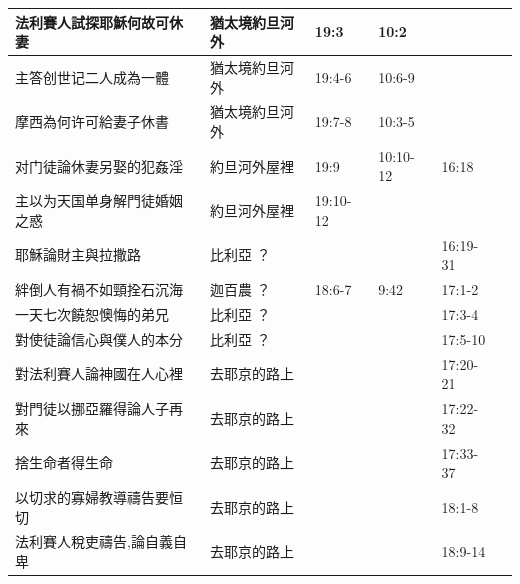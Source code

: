 \begin{table}[H]
\begin{tabular}{p{14em}|p{7.93em}|l|l|l|p{4.855em}}
法利賽人試探耶穌何故可休妻&猶太境約旦河外 &19:3&10:2& \multicolumn{1}{p{5.285em}|}{} & \multicolumn{1}{l}{} \\\midrule
主答创世记二人成為一體&猶太境約旦河外 &19:4-6&10:6-9& \multicolumn{1}{p{5.285em}|}{} & \multicolumn{1}{l}{} \\\midrule
摩西為何许可給妻子休書&猶太境約旦河外 &19:7-8&10:3-5& \multicolumn{1}{p{5.285em}|}{} & \multicolumn{1}{l}{} \\\midrule

对门徒論休妻另娶的犯姦淫&約旦河外屋裡 & 19:9 &10:10-12& \multicolumn{1}{p{5.285em}|}{16:18} & \multicolumn{1}{l}{} \\\midrule
主以为天国单身解門徒婚姻之惑&約旦河外屋裡  & \multicolumn{1}{p{5.285em}|}{19:10-12} & \multicolumn{1}{p{5.57em}|}{} &       & \multicolumn{1}{l}{} \\\midrule

耶穌論財主與拉撒路 & 比利亞 ？  &       &       & \multicolumn{1}{p{5.285em}|}{16:19-31} & \multicolumn{1}{l}{} \\ \midrule

絆倒人有禍不如頸拴石沉海& 迦百農 ？  &  \multicolumn{1}{p{5.285em}|}{18:6-7} & \multicolumn{1}{p{5.57em}|}{9:42}  & \multicolumn{1}{p{5.285em}|}{17:1-2} & \multicolumn{1}{l}{} \\\midrule

一天七次饒恕懊悔的弟兄& 比利亞 ？  &       &       & \multicolumn{1}{p{5.285em}|}{17:3-4} & \multicolumn{1}{l}{} \\\midrule

對使徒論信心與僕人的本分 & 比利亞 ？  &       &       & \multicolumn{1}{p{5.285em}|}{17:5-10} & \multicolumn{1}{l}{} \\\midrule


對法利賽人論神國在人心裡&去耶京的路上&       &       & \multicolumn{1}{p{5.285em}|}{17:20-21} & \multicolumn{1}{l}{} \\ \midrule

對門徒以挪亞羅得論人子再來&去耶京的路上&       &       & \multicolumn{1}{p{5.285em}|}{17:22-32} & \multicolumn{1}{l}{} \\ \midrule

捨生命者得生命&去耶京的路上&       &       & \multicolumn{1}{p{5.285em}|}{17:33-37} & \multicolumn{1}{l}{} \\ \midrule


以切求的寡婦教導禱告要恒切&去耶京的路上&       &       & \multicolumn{1}{p{5.285em}|}{18:1-8} & \multicolumn{1}{l}{} \\ \midrule

法利賽人稅吏禱告,論自義自卑&去耶京的路上&       &       & \multicolumn{1}{p{5.285em}|}{18:9-14} & \multicolumn{1}{l}{} \\\midrule

\end{tabular}%
\end{table}%


